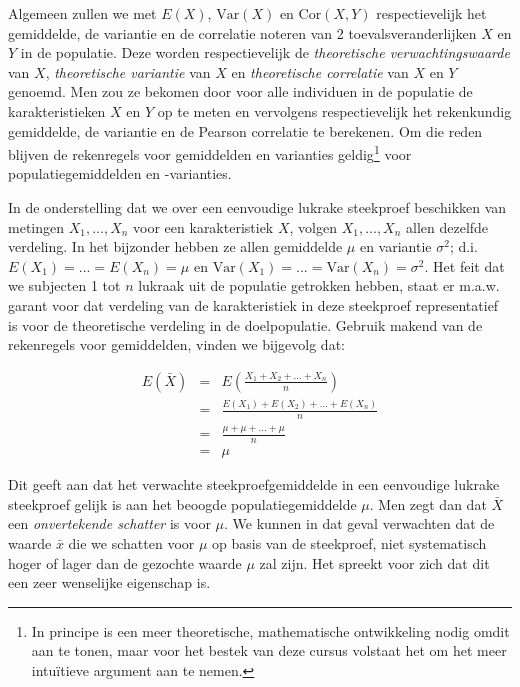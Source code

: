 \documentclass[
  12pt,dutch,coursenotes]{book}
\theoremstyle{definition}
\theoremstyle{definition}
\theoremstyle{definition}
\theoremstyle{remark}
\begin{document}
Algemeen zullen we met \(E(X)\), \(\text{Var}(X)\) en \(\text{Cor}(X,Y)\)
respectievelijk het gemiddelde, de variantie en de correlatie noteren van 2
toevalsveranderlijken \(X\) en \(Y\) in de populatie. Deze worden
respectievelijk de \emph{theoretische verwachtingswaarde} van \(X\), \emph{theoretische variantie} van \(X\) en \emph{theoretische correlatie} van \(X\) en \(Y\) genoemd.
Men zou ze bekomen door voor alle individuen in de populatie
de karakteristieken \(X\) en \(Y\) op te meten en vervolgens respectievelijk het
rekenkundig gemiddelde, de variantie en de Pearson correlatie te berekenen. Om die
reden blijven de rekenregels voor gemiddelden en varianties geldig\footnote{In principe is een meer theoretische, mathematische ontwikkeling nodig omdit aan te tonen, maar voor het bestek van deze cursus volstaat het om het
  meer intuïtieve argument aan te nemen.} voor populatiegemiddelden en
-varianties.

In de onderstelling dat we over een eenvoudige lukrake steekproef beschikken van metingen \(X_1,...,X_n\) voor een karakteristiek \(X\), volgen \(X_1,...,X_n\) allen dezelfde verdeling. In het
bijzonder hebben ze allen gemiddelde \(\mu\) en variantie \(\sigma^2\); d.i. \(E(X_1)=...=E(X_n)=\mu\) en \(\text{Var}(X_1)=...=\text{Var}(X_n)=\sigma^2\). Het feit
dat we subjecten 1 tot \(n\) lukraak uit de populatie getrokken hebben, staat
er m.a.w. garant voor dat verdeling van de karakteristiek in deze steekproef
representatief is voor de theoretische verdeling in de doelpopulatie.
Gebruik makend van de rekenregels voor gemiddelden, vinden we bijgevolg dat:

\begin{eqnarray*}
E(\bar X) &=& E \left(\frac{X_1+ X_2+ ... + X_n}{n}\right) \\
&= & \frac{E(X_1)+ E(X_2)+ ... + E(X_n)}{n} \\
&=& \frac{\mu + \mu + ... +\mu}{n} \\
&= & \mu
\end{eqnarray*}

Dit geeft aan dat het verwachte steekproefgemiddelde in een eenvoudige
lukrake steekproef gelijk is aan het beoogde populatiegemiddelde \(\mu\). Men
zegt dan dat \(\bar X\) een \emph{onvertekende schatter} is voor \(\mu\). We kunnen in
dat geval verwachten dat de waarde \(\bar x\) die we schatten voor \(\mu\) op
basis van de steekproef, niet systematisch hoger of lager dan de gezochte waarde \(\mu\) zal zijn. Het spreekt voor zich dat dit een zeer wenselijke eigenschap is.
\end{document}
